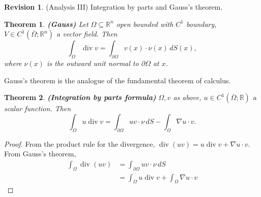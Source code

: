 \documentclass[12pt]{article}
\DeclareMathOperator{\diver}{div}
\newtheorem*{theorem*}{Theorem}
\theoremstyle{definition}
\newtheorem*{revision}{Revision}
\begin{document}
\begin{revision}
(Analysis III) Integration by parts and Gauss's theorem.

\begin{theorem*}
\emph{\textbf{(Gauss)}} Let $\Omega\subseteq\mathbb{R}^n$ open bounded with $C^1$ boundary, $V\in C^1(\overline{\Omega};\mathbb{R}^n)$ a vector field. Then
\[\int_{\Omega}\diver v=\int_{\partial\Omega}v(x)\cdot\nu(x)\,dS(x),\]
where $\nu(x)$ is the outward unit normal to $\partial\Omega$ at $x$.
\end{theorem*}

Gauss's theorem is the analogue of the fundamental theorem of calculus.

\begin{theorem*}
\emph{\textbf{(Integration by parts formula)}} $\Omega,v$ as above, $u\in C^1(\overline{\Omega};\mathbb{R})$ a scalar function. Then
\[\int_{\Omega}u\diver v=\int_{\partial\Omega}uv\cdot\nu\,dS-\int_{\Omega}\nabla u\cdot v.\]
\end{theorem*}

\begin{proof}
From the product rule for the divergence, $\diver(uv)=u\diver v+\nabla u\cdot v$. From Gauss's theorem,
\begin{align*}
\int_{\Omega}\diver(uv)&=\int_{\partial\Omega}uv\cdot\nu\,dS\\
&=\int_{\Omega}u\diver v+\int_{\Omega}\nabla u\cdot v
\end{align*}
\end{proof}
\end{revision}
\end{document}
